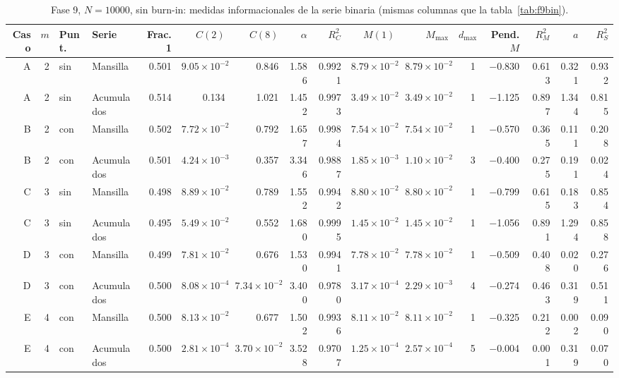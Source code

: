 \documentclass[11pt,letterpaper]{article}
\begin{document}
\begin{table}[H]
\centering
\scriptsize
\setlength{\tabcolsep}{3.5pt}
\caption{Fase 9, $N=10000$, sin burn-in: medidas informacionales de la serie binaria (mismas columnas que la tabla~\ref{tab:f9bin}).}\label{tab:f9binsin}
\begin{adjustbox}{max width=\textwidth}
\begin{tabular}{rrllrrrrrrrrrrrr}
\toprule
Caso & $m$ & Punt. & Serie & Frac. 1 & $C(2)$ & $C(8)$ & $\alpha$ & $R^2_C$ & $M(1)$ & $M_{\max}$ & $d_{\max}$ & Pend. $M$ & $R^2_M$ & $a$ & $R^2_S$ \\
\midrule
A & 2 & sin & Mansilla & 0.501 & $9.05\times10^{-2}$ & 0.846 & 1.586 & 0.9921 & $8.79\times10^{-2}$ & $8.79\times10^{-2}$ & 1 & $-$0.830 & 0.613 & 0.321 & 0.932 \\
A & 2 & sin & Acumulados & 0.514 & 0.134 & 1.021 & 1.452 & 0.9973 & $3.49\times10^{-2}$ & $3.49\times10^{-2}$ & 1 & $-$1.125 & 0.897 & 1.344 & 0.815 \\
B & 2 & con & Mansilla & 0.502 & $7.72\times10^{-2}$ & 0.792 & 1.657 & 0.9984 & $7.54\times10^{-2}$ & $7.54\times10^{-2}$ & 1 & $-$0.570 & 0.365 & 0.111 & 0.208 \\
B & 2 & con & Acumulados & 0.501 & $4.24\times10^{-3}$ & 0.357 & 3.346 & 0.9887 & $1.85\times10^{-3}$ & $1.10\times10^{-2}$ & 3 & $-$0.400 & 0.275 & 0.191 & 0.024 \\
C & 3 & sin & Mansilla & 0.498 & $8.89\times10^{-2}$ & 0.789 & 1.552 & 0.9942 & $8.80\times10^{-2}$ & $8.80\times10^{-2}$ & 1 & $-$0.799 & 0.615 & 0.183 & 0.854 \\
C & 3 & sin & Acumulados & 0.495 & $5.49\times10^{-2}$ & 0.552 & 1.680 & 0.9995 & $1.45\times10^{-2}$ & $1.45\times10^{-2}$ & 1 & $-$1.056 & 0.891 & 1.294 & 0.858 \\
D & 3 & con & Mansilla & 0.499 & $7.81\times10^{-2}$ & 0.676 & 1.530 & 0.9941 & $7.78\times10^{-2}$ & $7.78\times10^{-2}$ & 1 & $-$0.509 & 0.408 & 0.020 & 0.276 \\
D & 3 & con & Acumulados & 0.500 & $8.08\times10^{-4}$ & $7.34\times10^{-2}$ & 3.400 & 0.9780 & $3.17\times10^{-4}$ & $2.29\times10^{-3}$ & 4 & $-$0.274 & 0.463 & 0.319 & 0.511 \\
E & 4 & con & Mansilla & 0.500 & $8.13\times10^{-2}$ & 0.677 & 1.502 & 0.9936 & $8.11\times10^{-2}$ & $8.11\times10^{-2}$ & 1 & $-$0.325 & 0.212 & 0.002 & 0.090 \\
E & 4 & con & Acumulados & 0.500 & $2.81\times10^{-4}$ & $3.70\times10^{-2}$ & 3.528 & 0.9707 & $1.25\times10^{-4}$ & $2.57\times10^{-4}$ & 5 & $-$0.004 & 0.001 & 0.319 & 0.070 \\

\end{tabular}
\end{adjustbox}
\end{table}
\end{document}
